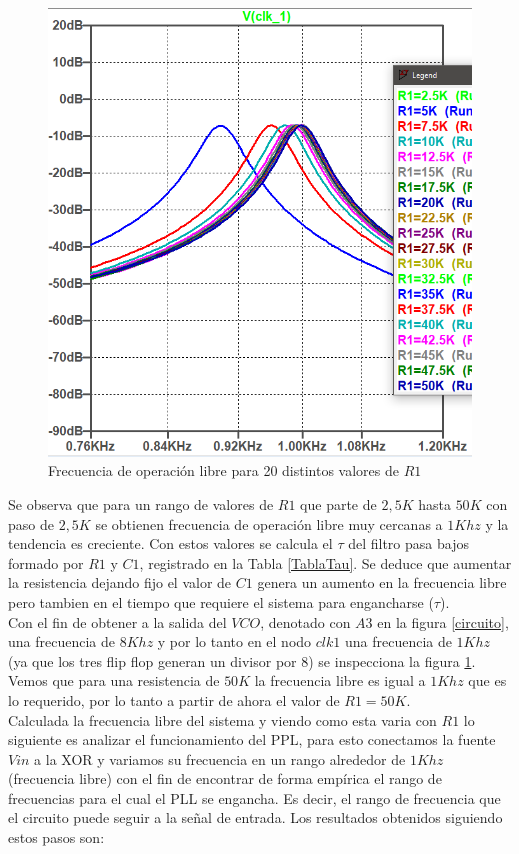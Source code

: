 \documentclass[10pt,a4paper]{IEEEtran}
\begin{document}
\begin{figure}[H]
    \centering
    \includegraphics[width=.45\textwidth]{Fig/FrecuenciaLibreVariandoR50K}
    \caption{Frecuencia de operación libre para 20 distintos valores de $R1$}
    \label{RBarrido}
\end{figure}
Se observa que para un rango de valores de $R1$ que parte de $2,5K$ hasta $50K$ con paso de $2,5K$ se obtienen frecuencia de operación libre 
muy cercanas a $1Khz$ y la tendencia es creciente. Con estos valores se calcula el $\tau$ del filtro pasa bajos formado por 
$R1$ y $C1$, registrado en la Tabla \ref{TablaTau}. Se deduce que aumentar la resistencia dejando fijo el valor de $C1$ genera un aumento 
en la frecuencia libre pero tambien en el tiempo que requiere el sistema para engancharse ($\tau$).\\
Con el fin de obtener a la salida del $VCO$, denotado con $A3$ en la figura \ref{circuito}, una frecuencia de $8Khz$ y por lo tanto en el nodo 
$clk1$ una frecuencia de $1Khz$ (ya que los tres flip flop generan un divisor por 8) se inspecciona la figura \ref{RBarrido}. Vemos que para 
una resistencia de $50K$ la frecuencia libre es igual a $1Khz$ que es lo requerido, por lo tanto a partir de ahora el valor de $R1=50K$.\\
Calculada la frecuencia libre del sistema y viendo como esta varia con $R1$ lo siguiente es analizar el funcionamiento del PPL, para esto conectamos 
la fuente $Vin$ a la XOR y variamos su frecuencia en un rango alrededor de $1Khz$ (frecuencia libre) con el fin de encontrar de forma empírica el rango
de frecuencias para el cual el PLL se engancha. Es decir, el rango de frecuencia que el circuito puede seguir a la señal de entrada. Los resultados obtenidos siguiendo estos 
pasos son:
\end{document}
